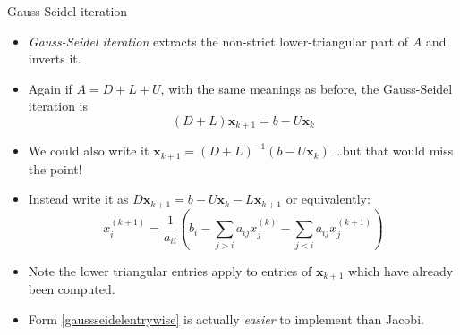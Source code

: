 \documentclass[10pt,hyperref]{beamer}
\newcommand{\bx}{\mathbf{x}}
\begin{document}
\begin{frame}{Gauss-Seidel iteration}

\begin{itemize}
\item \emph{Gauss-Seidel iteration} extracts the non-strict lower-triangular part of $A$ and inverts it.
\item Again if $A = D + L + U$, with the same meanings as before, the Gauss-Seidel iteration is
\begin{equation}
(D + L) \bx_{k+1} = b - U \bx_k  \label{gaussseidel}
\end{equation}
\item We could also write it \quad $\bx_{k+1} = (D+L)^{-1} \left(b - U \bx_k\right)$ \quad \dots but that would miss the point!
\item Instead write it as \quad $D \bx_{k+1} = b - U \bx_k - L \bx_{k+1}$ \quad or equivalently:
\begin{equation}
x_i^{(k+1)} = \frac{1}{a_{ii}} \left(b_i - \sum_{j > i} a_{ij} x_j^{(k)} - \sum_{j < i} a_{ij} x_j^{(k+1)}\right)  \label{gaussseidelentrywise}
\end{equation}
\item Note the lower triangular entries apply to entries of $\bx_{k+1}$ which have already been computed.
\item Form \eqref{gaussseidelentrywise} is actually \emph{easier} to implement than Jacobi.
\end{itemize}
\end{frame}
\end{document}
